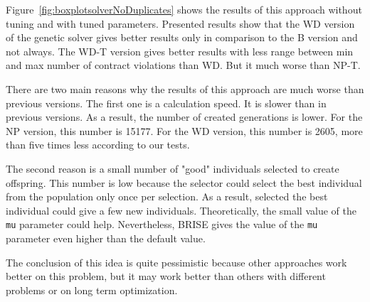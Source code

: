 Figure~\ref{fig:boxplotsolverNoDuplicates} shows the results of this approach without tuning and with tuned parameters. Presented results show that the WD version of the genetic solver gives better results only in comparison to the B version and not always. The WD-T version gives better results with less range between min and max number of contract violations than WD. But it much worse than NP-T.

There are two main reasons why the results of this approach are much worse than previous versions. The first one is a calculation speed. It is slower than in previous versions. As a result, the number of created generations is lower. For the NP version, this number is 15177. For the WD version, this number is 2605, more than five times less according to our tests.

The second reason is a small number of "good" individuals selected to create offspring. This number is low because the selector could select the best individual from the population only once per selection. As a result, selected the best individual could give a few new individuals. Theoretically, the small value of the \texttt{mu} parameter could help. Nevertheless, BRISE gives the value of the \texttt{mu} parameter even higher than the default value. 

The conclusion of this idea is quite pessimistic because other approaches work better on this problem, but it may work better than others with different problems or on long term optimization.


